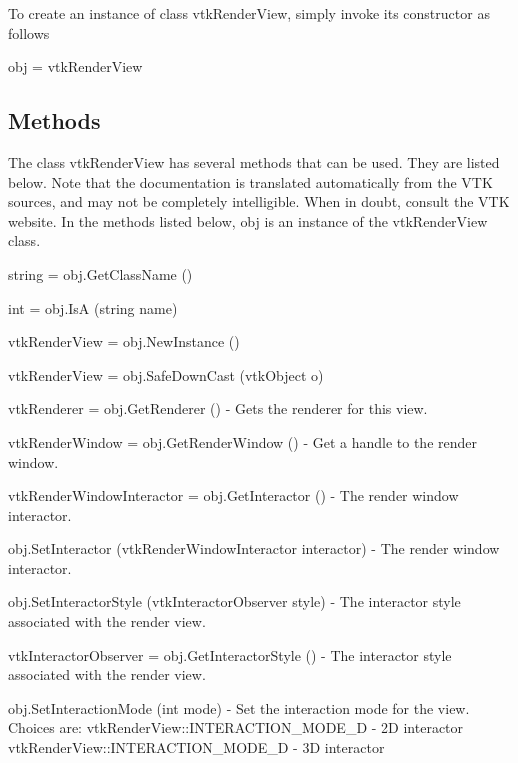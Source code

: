 To create an instance of class vtk\-Render\-View, simply invoke its constructor as follows \begin{DoxyVerb}  obj = vtkRenderView
\end{DoxyVerb}
 \hypertarget{vtkwidgets_vtkxyplotwidget_Methods}{}\subsection{Methods}\label{vtkwidgets_vtkxyplotwidget_Methods}
The class vtk\-Render\-View has several methods that can be used. They are listed below. Note that the documentation is translated automatically from the V\-T\-K sources, and may not be completely intelligible. When in doubt, consult the V\-T\-K website. In the methods listed below, {\ttfamily obj} is an instance of the vtk\-Render\-View class. 
\begin{DoxyItemize}
\item {\ttfamily string = obj.\-Get\-Class\-Name ()}  
\item {\ttfamily int = obj.\-Is\-A (string name)}  
\item {\ttfamily vtk\-Render\-View = obj.\-New\-Instance ()}  
\item {\ttfamily vtk\-Render\-View = obj.\-Safe\-Down\-Cast (vtk\-Object o)}  
\item {\ttfamily vtk\-Renderer = obj.\-Get\-Renderer ()} -\/ Gets the renderer for this view.  
\item {\ttfamily vtk\-Render\-Window = obj.\-Get\-Render\-Window ()} -\/ Get a handle to the render window.  
\item {\ttfamily vtk\-Render\-Window\-Interactor = obj.\-Get\-Interactor ()} -\/ The render window interactor.  
\item {\ttfamily obj.\-Set\-Interactor (vtk\-Render\-Window\-Interactor interactor)} -\/ The render window interactor.  
\item {\ttfamily obj.\-Set\-Interactor\-Style (vtk\-Interactor\-Observer style)} -\/ The interactor style associated with the render view.  
\item {\ttfamily vtk\-Interactor\-Observer = obj.\-Get\-Interactor\-Style ()} -\/ The interactor style associated with the render view.  
\item {\ttfamily obj.\-Set\-Interaction\-Mode (int mode)} -\/ Set the interaction mode for the view. Choices are\-: vtk\-Render\-View\-::\-I\-N\-T\-E\-R\-A\-C\-T\-I\-O\-N\-\_\-\-M\-O\-D\-E\-\_\-D -\/ 2\-D interactor vtk\-Render\-View\-::\-I\-N\-T\-E\-R\-A\-C\-T\-I\-O\-N\-\_\-\-M\-O\-D\-E\-\_\-D -\/ 3\-D interactor  

\end{DoxyItemize}
